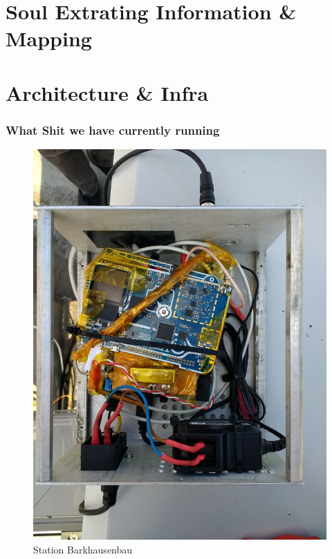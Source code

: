 \documentclass[aspectratio=169]{beamer}
\begin{document}

\section{Soul Extrating Information \& Mapping }




\section{Architecture \& Infra }


\begin{frame}
\frametitle{What Shit we have currently running}

\begin{figure}

\centering
\includegraphics[height=0.94\textheight, angle=90]{figs/station_barkhausen.jpg}
\caption{ Station Barkhausenbau }
\end{figure}

\end{frame}
\end{document}
